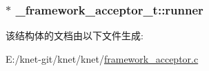 \subsubsection[{runner}]{$\ast$ \+\_\+framework\+\_\+acceptor\+\_\+t\+::runner}\label{a00009_af7c10916c1636b7049e5ea2c12d8c294_af7c10916c1636b7049e5ea2c12d8c294}


该结构体的文档由以下文件生成\+:\begin{DoxyCompactItemize}
\item 
E\+:/knet-\/git/knet/knet/\hyperlink{a00050}{framework\+\_\+acceptor.\+c}\end{DoxyCompactItemize}
